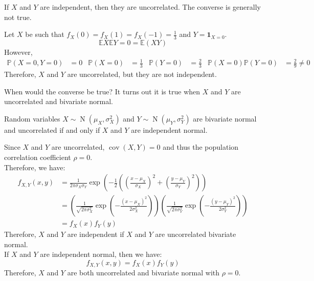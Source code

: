 \documentclass{huhtakm-template-book-v2}
\newcommand{\prob}{\mathbb{P}}
\newcommand{\expect}{\mathbb{E}}
\DeclareMathOperator{\N}{N}
\DeclareMathOperator{\cov}{cov}
\begin{document}
    \begin{rem}
        If $X$ and $Y$ are independent, then they are uncorrelated. The converse is generally not true.
    \end{rem}
    \begin{eg}
        Let $X$ be such that $f_{X}(0) = f_{X}(1) = f_{X}(-1) = \frac{1}{3}$ and $Y = \mathbf{1}_{X = 0}$.
        \begin{equation*}
            \expect{X}\expect{Y} = 0 = \expect(XY)
        \end{equation*}
        However,
        \begin{align*}
            \prob(X = 0, Y = 0) &= 0 & \prob(X = 0) &= \frac{1}{3} & \prob(Y = 0) &= \frac{2}{3} & \prob(X = 0)\prob(Y = 0) &= \frac{2}{9} \neq 0
        \end{align*}
        Therefore, $X$ and $Y$ are uncorrelated, but they are not independent.
    \end{eg}
    When would the converse be true? It turns out it is true when $X$ and $Y$ are uncorrelated and bivariate normal. 
    \begin{thm}
        \label{Chapter 6 (Theorem) Bivariate normal and uncorrelated}
        Random variables $X \sim \N(\mu_{X}, \sigma_{X}^{2})$ and $Y \sim \N(\mu_{Y}, \sigma_{Y}^{2})$ are bivariate normal and uncorrelated if and only if $X$ and $Y$ are independent normal.
    \end{thm}
    \begin{proofing}
        Since $X$ and $Y$ are uncorrelated, $\cov(X, Y) = 0$ and thus the population correlation coefficient $\rho = 0$.\\
        Therefore, we have:
        \begin{align*}
            f_{X, Y}(x, y) &= \frac{1}{2\pi\sigma_{X}\sigma_{Y}}\exp\left(-\frac{1}{2}\left(\left(\frac{x-\mu_{X}}{\sigma_{X}}\right)^{2}+\left(\frac{y-\mu_{Y}}{\sigma_{Y}}\right)^{2}\right)\right)\\
            &= \left(\frac{1}{\sqrt{2\pi\sigma_{X}^{2}}}\exp\left(-\frac{(x-\mu_{X})^{2}}{2\sigma_{X}^{2}}\right)\right)\left(\frac{1}{\sqrt{2\pi\sigma_{Y}^{2}}}\exp\left(-\frac{(y-\mu_{Y})^{2}}{2\sigma_{Y}^{2}}\right)\right)\\
            &= f_{X}(x)f_{Y}(y)
        \end{align*}
        Therefore, $X$ and $Y$ are independent if $X$ and $Y$ are uncorrelated bivariate normal.\\
        If $X$ and $Y$ are independent normal, then we have:
        \begin{equation*}
            f_{X, Y}(x, y) = f_{X}(x)f_{Y}(y)
        \end{equation*}
        Therefore, $X$ and $Y$ are both uncorrelated and bivariate normal with $\rho = 0$.
    \end{proofing}
    \newpage
\end{document}
